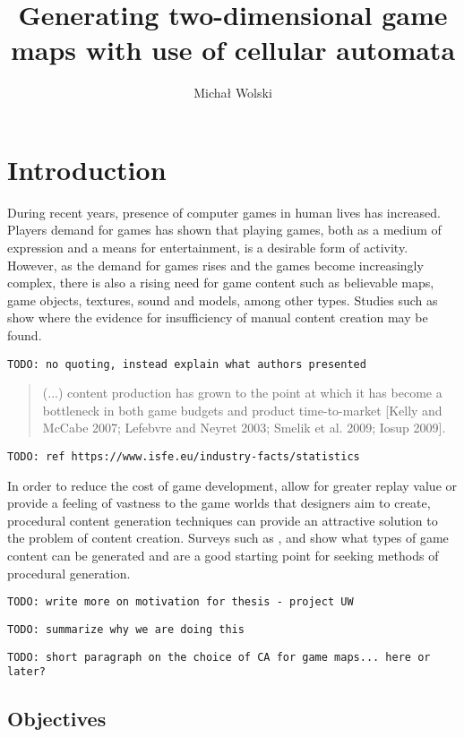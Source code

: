 \documentclass[12pt]{report}
\title{Generating two-dimensional game maps with use of cellular automata}
\author{Michał Wolski}
\newcommand{\todo}[1]{}
\renewcommand{\todo}[1]{{\color{red} \par \noindent \footnotesize \texttt{TODO: {#1} }}}
\begin{document}
 
\maketitle
\tableofcontents 

\chapter{Introduction} \label{rozdzial.wstep} 
 
During recent years, presence of computer games in human lives has increased. Players demand for games has shown that playing games, both as a medium of expression and a means for entertainment, is a desirable form of activity. However, as the demand for games rises and the games become increasingly complex, there is also a rising need for game content such as believable maps, game objects, textures, sound and models, among other types. Studies such as \autocite{hendrikx2013procedural} show where the evidence for insufficiency of manual content creation may be found. 

\todo{no quoting, instead explain what authors presented}

\begin{quotation}
	(...) content production has grown to the point at which it has become a bottleneck in both game budgets and product time-to-market [Kelly and McCabe 2007; Lefebvre and	Neyret 2003; Smelik et al. 2009; Iosup 2009].
\end{quotation}

\todo{ref https://www.isfe.eu/industry-facts/statistics}

In order to reduce the cost of game development, allow for greater replay value or provide a feeling of vastness to the game worlds that designers aim to create, procedural content generation techniques can provide an attractive solution to the problem of content creation. Surveys such as \autocite{hendrikx2013procedural}, \autocite{togelius2011search} and \autocite{de2011survey} show what types of game content can be generated and are a good starting point for seeking methods of procedural generation.


\todo{write more on motivation for thesis - project UW}
\todo{summarize why we are doing this}
\todo{short paragraph on the choice of CA for game maps... here or later?}


\section{Objectives}
\end{document}
